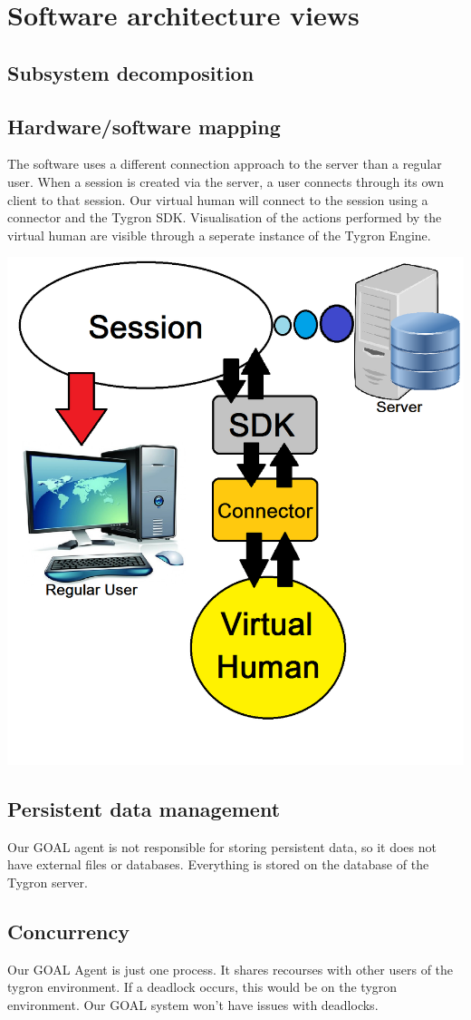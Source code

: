 \usepackage{graphicx}

\label{Software architecture views}
\section{Software architecture views}

\subsection{Subsystem decomposition}
\subsection{Hardware/software mapping}
The software uses a different connection approach to the server than a regular user. When a session is created via the server, a user connects through its own client to that session. Our virtual human will connect to the session using a connector and the Tygron SDK. Visualisation of the actions performed by the virtual human are visible through a seperate instance of the Tygron Engine.

\includegraphics{Hardware_software_mapping}

\subsection{Persistent data management}
Our GOAL agent is not responsible for storing persistent data, so it does not have external files or databases. Everything is stored on the database of the Tygron server.
\subsection{Concurrency}
Our GOAL Agent is just one process. It shares recourses with other users of the tygron environment. If a deadlock occurs, this would be on the tygron environment. Our GOAL system won't have issues with deadlocks.
\newpage
